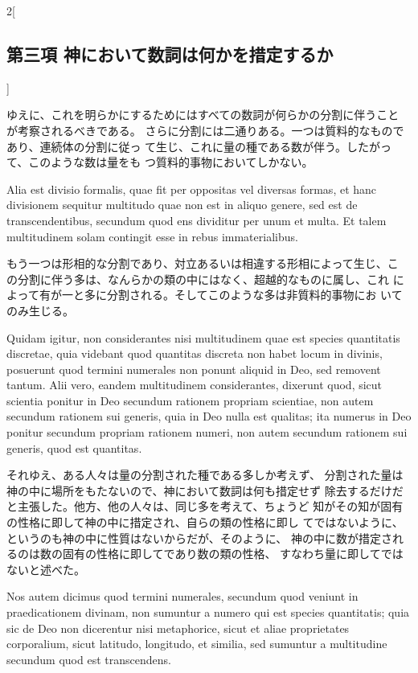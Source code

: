 \documentclass[paper=a4paper,fontsize=10pt,jafontsize=9pt,titlepage]{jlreq}
\begin{document}
\begin{paracol}{2}[\subsection{第三項 神において数詞は何かを措定するか}]
\switchcolumn


ゆえに、これを明らかにするためにはすべての数詞が何らかの分割に伴うこと
 が考察されるべきである。
さらに分割には二通りある。一つは質料的なものであり、連続体の分割に従っ
 て生じ、これに量の種である数が伴う。したがって、このような数は量をも
 つ質料的事物においてしかない。


\switchcolumn*


Alia est divisio formalis, quae fit per oppositas vel
diversas formas, et hanc divisionem sequitur multitudo quae non est in
aliquo genere, sed est de transcendentibus, secundum quod ens
dividitur per unum et multa. 
Et talem multitudinem solam contingit
esse in rebus immaterialibus.


\switchcolumn


もう一つは形相的な分割であり、対立あるいは相違する形相によって生じ、こ
 の分割に伴う多は、なんらかの類の中にはなく、超越的なものに属し、これ
 によって有が一と多に分割される。そしてこのような多は非質料的事物にお
 いてのみ生じる。


\switchcolumn*


Quidam igitur, non considerantes nisi
multitudinem quae est species quantitatis discretae, quia videbant
quod quantitas discreta non habet locum in divinis, posuerunt quod
termini numerales non ponunt aliquid in Deo, sed removent tantum. Alii
vero, eandem multitudinem considerantes, dixerunt quod, sicut scientia
ponitur in Deo secundum rationem propriam scientiae, non autem
secundum rationem sui generis, quia in Deo nulla est qualitas; ita
numerus in Deo ponitur secundum propriam rationem numeri, non autem
secundum rationem sui generis, quod est quantitas.


\switchcolumn


それゆえ、ある人々は量の分割された種である多しか考えず、
分割された量は神の中に場所をもたないので、神において数詞は何も措定せず
 除去するだけだと主張した。他方、他の人々は、同じ多を考えて、ちょうど
 知がその知が固有の性格に即して神の中に措定され、自らの類の性格に即し
 てではないように、というのも神の中に性質はないからだが、そのように、
 神の中に数が措定されるのは数の固有の性格に即してであり数の類の性格、
 すなわち量に即してではないと述べた。


\switchcolumn*


Nos autem dicimus
quod termini numerales, secundum quod veniunt in praedicationem
divinam, non sumuntur a numero qui est species quantitatis; quia sic
de Deo non dicerentur nisi metaphorice, sicut et aliae proprietates
corporalium, sicut latitudo, longitudo, et similia, sed sumuntur a
multitudine secundum quod est transcendens.



\end{paracol}
\end{document}
